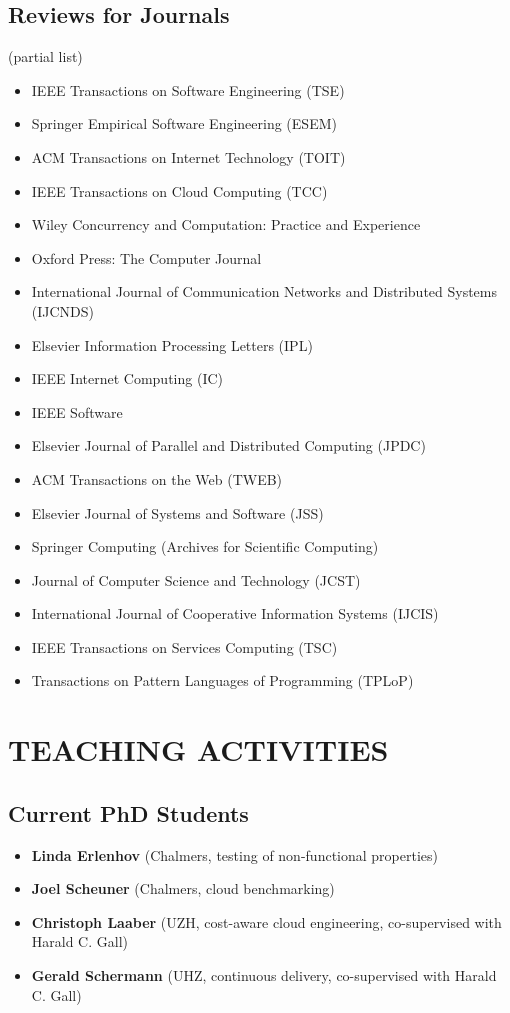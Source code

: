 \documentclass[paper=letter,fontsize=11pt]{scrartcl} %
\newcommand{\NewPart}[2]{\section*{\uppercase{#1} #2}}
\begin{document}
\subsection*{Reviews for Journals}

(partial list)

\begin{itemize}
\item IEEE Transactions on Software Engineering (TSE)
\item Springer Empirical Software Engineering (ESEM)
\item ACM Transactions on Internet Technology (TOIT)
\item IEEE Transactions on Cloud Computing (TCC)
\item Wiley Concurrency and Computation: Practice and Experience
\item Oxford Press: The Computer Journal
\item International Journal of Communication Networks and Distributed Systems (IJCNDS)
\item Elsevier Information Processing Letters (IPL)
\item IEEE Internet Computing (IC)
\item IEEE Software
\item Elsevier Journal of Parallel and Distributed Computing (JPDC)
\item ACM Transactions on the Web (TWEB)
\item Elsevier Journal of Systems and Software (JSS)
\item Springer Computing (Archives for Scientific Computing)
\item Journal of Computer Science and Technology (JCST)
\item International Journal of Cooperative Information Systems (IJCIS)
\item IEEE Transactions on Services Computing (TSC)
\item Transactions on Pattern Languages of Programming (TPLoP)
\end{itemize}


\NewPart{Teaching Activities}{}

  \subsection*{Current PhD Students}

\begin{itemize}
\item \textbf{Linda Erlenhov}  (Chalmers, testing of non-functional properties)
\item \textbf{Joel Scheuner}  (Chalmers, cloud benchmarking)
\item \textbf{Christoph Laaber} (UZH, cost-aware cloud engineering, co-supervised with Harald C. Gall)
\item \textbf{Gerald Schermann} (UHZ, continuous delivery, co-supervised with Harald C. Gall)
\end{itemize}
\end{document}
